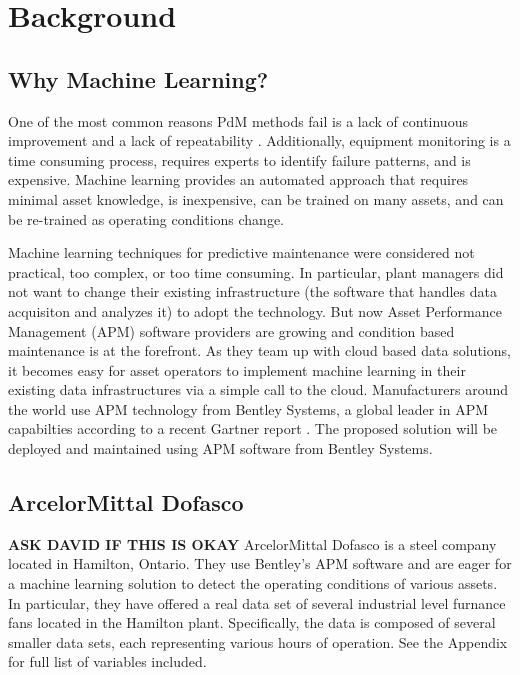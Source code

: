 \section{Background} %

\subsection{Why Machine Learning?}
One of the most common reasons PdM methods fail is a lack of continuous improvement and a lack of repeatability \cite{whypdmfails}.
Additionally, equipment monitoring is a time consuming process, requires experts to identify failure patterns, and is expensive.
Machine learning provides an automated approach that requires minimal asset knowledge, is inexpensive, can be trained on many assets, and can be re-trained as operating conditions change.

Machine learning techniques for predictive maintenance were considered not practical, too complex, or too time consuming.
In particular, plant managers did not want to change their existing infrastructure (the software that handles data acquisiton and analyzes it) to adopt the technology.
But now Asset Performance Management (APM) software providers are growing and condition based maintenance is at the forefront.
As they team up with cloud based data solutions, it becomes easy for asset operators to implement machine learning in their existing data infrastructures via a simple call to the cloud.
Manufacturers around the world use APM technology from Bentley Systems, a global leader in APM capabilties according to a recent Gartner report \cite{foust_steenstrup_2018}.
The proposed solution will be deployed and maintained using APM software from Bentley Systems.

\subsection{ArcelorMittal Dofasco}

\textbf{ASK DAVID IF THIS IS OKAY}
ArcelorMittal Dofasco is a steel company located in Hamilton, Ontario.
They use Bentley's APM software and are eager for a machine learning solution to detect the operating conditions of various assets. 
In particular, they have offered a real data set of several industrial level furnance fans located in the Hamilton plant. 
Specifically, the data is composed of several smaller data sets, each representing various hours of operation.
See the Appendix for full list of variables included.

